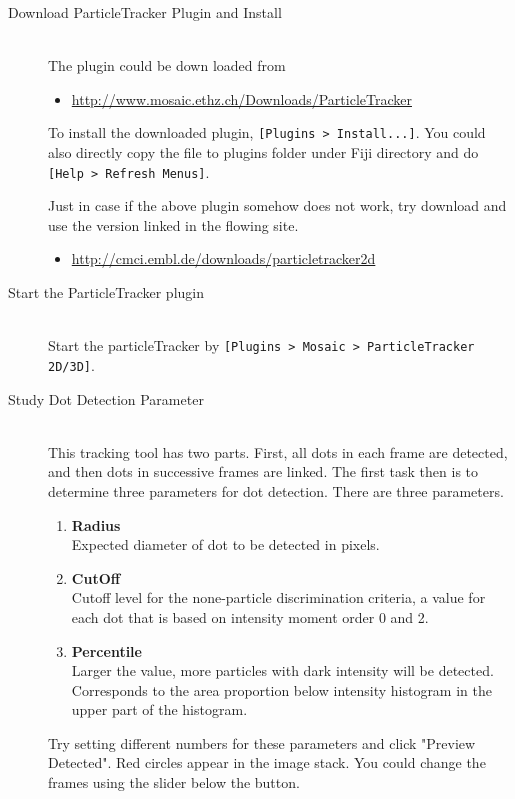 \documentclass[11pnt]{article}
\begin{document}
\begin{description}

\item[Download ParticleTracker Plugin and Install]\hfill\\

The plugin could be down loaded from
\begin{itemize}
\item \url{http://www.mosaic.ethz.ch/Downloads/ParticleTracker}
\end{itemize}
To install the downloaded plugin, \verb"[Plugins > Install...]". You could also directly copy the file to plugins folder under Fiji directory and do \verb"[Help > Refresh Menus]".

Just in case if the above plugin somehow does not work, try download and use the version linked in the flowing site. 

\begin{itemize}
\item \url{http://cmci.embl.de/downloads/particletracker2d}
\end{itemize}

\item[Start the ParticleTracker plugin]\hfill\\

Start the particleTracker by \verb"[Plugins > Mosaic > ParticleTracker 2D/3D]". 

\item[Study Dot Detection Parameter]\hfill\\

This tracking tool has two parts. First, all dots in each frame are detected, and then dots in successive frames are linked. The first task then is to determine three parameters for dot detection. There are three parameters. 
\begin{enumerate}
\item \textbf{Radius}\hfill\\
Expected diameter of dot to be detected in pixels. 
\item \textbf{CutOff}\hfill\\
Cutoff level for the none-particle discrimination criteria, a value for each dot that is based on intensity moment order 0 and 2. 
\item \textbf{Percentile}\hfill\\
Larger the value, more particles with dark intensity will be detected. Corresponds to the area proportion below intensity histogram in the upper part of the histogram. 
\end{enumerate}
Try setting different numbers for these parameters and click "Preview Detected". Red circles appear in the image stack. You could change the frames using the slider below the button. 


\end{description}
\end{document}
